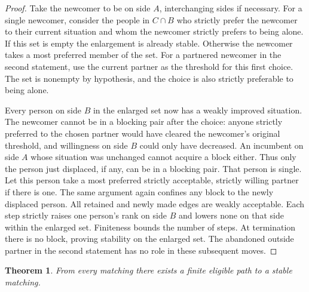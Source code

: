 \documentclass[11pt]{article}
\newtheorem{theorem}{Theorem}
\begin{document}
\begin{proof}
Take the newcomer to be on side \(A\), interchanging sides if necessary. For a single newcomer, consider the people in \(C\cap B\) who strictly prefer the newcomer to their current situation and whom the newcomer strictly prefers to being alone. If this set is empty the enlargement is already stable. Otherwise the newcomer takes a most preferred member of the set. For a partnered newcomer in the second statement, use the current partner as the threshold for this first choice. The set is nonempty by hypothesis, and the choice is also strictly preferable to being alone.

Every person on side \(B\) in the enlarged set now has a weakly improved situation. The newcomer cannot be in a blocking pair after the choice: anyone strictly preferred to the chosen partner would have cleared the newcomer's original threshold, and willingness on side \(B\) could only have decreased. An incumbent on side \(A\) whose situation was unchanged cannot acquire a block either. Thus only the person just displaced, if any, can be in a blocking pair. That person is single. Let this person take a most preferred strictly acceptable, strictly willing partner if there is one. The same argument again confines any block to the newly displaced person. All retained and newly made edges are weakly acceptable. Each step strictly raises one person's rank on side \(B\) and lowers none on that side within the enlarged set. Finiteness bounds the number of steps. At termination there is no block, proving stability on the enlarged set. The abandoned outside partner in the second statement has no role in these subsequent moves.
\end{proof}

\begin{theorem}\label{thm:path}
From every matching there exists a finite eligible path to a stable matching.
\end{theorem}
\end{document}
